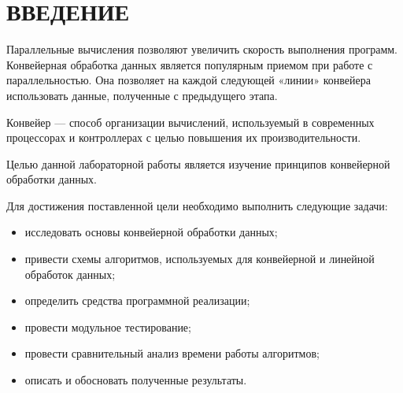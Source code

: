 \part*{ВВЕДЕНИЕ}

Параллельные вычисления позволяют увеличить скорость выполнения программ. Конвейерная обработка данных является популярным приемом при работе с параллельностью. Она позволяет на каждой следующей «линии» конвейера использовать данные, полученные с предыдущего этапа.

Конвейер — способ организации вычислений, используемый в современных процессорах и контроллерах с целью повышения их производительности.

Целью данной лабораторной работы является изучение принципов конвейерной обработки данных.

Для достижения поставленной цели необходимо выполнить следующие задачи:

\begin{itemize}[label=---]
	\item исследовать основы конвейерной обработки данных;
	\item привести схемы алгоритмов, используемых для конвейерной и линейной обработок данных;
	\item определить средства программной реализации;
	\item провести модульное тестирование;
	\item провести сравнительный анализ времени работы алгоритмов;
	\item описать и обосновать полученные результаты.
\end{itemize}